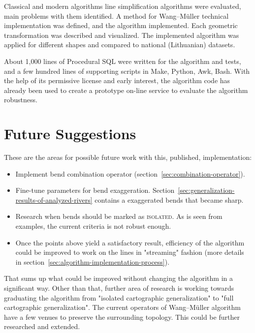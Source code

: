\documentclass[a4paper]{article}
\newcommand{\WM}{Wang--M{\"u}ller}
\begin{document}
Classical and modern algorithms line simplification algorithms were evaluated,
main problems with them identified. A method for {\WM} technical
implementation was defined, and the algorithm implemented. Each geometric
transformation was described and visualized. The implemented algorithm was
applied for different shapes and compared to national (Lithuanian) datasets.

About 1,000 lines of Procedural SQL were written for the algorithm and tests,
and a few hundred lines of supporting scripts in Make, Python, Awk, Bash. With
the help of its permissive license and early interest, the algorithm code has
already been used to create a prototype on-line service to evaluate the
algorithm robustness.

\section{Future Suggestions}
\label{sec:related_work}

These are the areas for possible future work with this, published,
implementation:

\begin{itemize}

    \item Implement bend combination operator
        (section~\ref{sec:combination-operator}).

    \item Fine-tune parameters for bend exaggeration.
        Section~\ref{sec:generalization-results-of-analyzed-rivers} contains
        a exaggerated bends that became sharp.

    \item Research when bends should be marked as \textsc{isolated}. As is
        seen from examples, the current criteria is not robust enough.

    \item Once the points above yield a satisfactory result, efficiency of the
        algorithm could be improved to work on the lines in "streaming" fashion
        (more details in section~\ref{sec:algorithm-implementation-process}).

\end{itemize}

That sums up what could be improved without changing the algorithm in a
significant way. Other than that, further area of research is working towards
graduating the algorithm from "isolated cartographic generalization" to "full
cartographic generalization".  The current operators of {\WM} algorithm have a
few venues to preserve the surrounding topology. This could be further
researched and extended.
\end{document}
